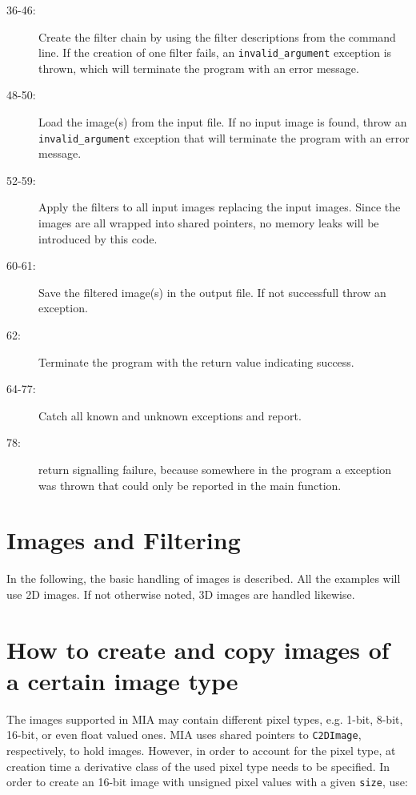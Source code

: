 \begin{description}
\item [36-46:] Create the filter chain by using the filter descriptions from the command line. 
       If the creation of one filter fails, an \texttt{invalid\_argument} exception is thrown, which will terminate the 
       program with an error message. 
\item [48-50:] Load the image(s) from the input file. 
       If no input image is found, throw an \texttt{invalid\_argument} exception that will terminate the program with an error message. 
\item [52-59:] Apply the filters to all input images replacing the input images. 
       Since the images are all wrapped into shared pointers, no memory leaks will be introduced by this code. 
\item [60-61:] Save the filtered image(s) in the output file. If not successfull throw an exception.
\item [62:] Terminate the program with the return value indicating success.
\item [64-77:] Catch all known and unknown exceptions and report.
\item [78:] return signalling failure, because somewhere in the program a exception was thrown that could only be reported 
    in the main function. 
\end{description}

\section{Images and Filtering}

\label{ch:images}

In the following, the basic handling of images is described. 
All the examples will use 2D images. 
If not otherwise noted, 3D images are handled likewise. 

\section{How to create and copy images of a certain image type}

The images supported in MIA  may contain different pixel types, e.g. 1-bit, 8-bit, 16-bit, or even float valued ones. 
MIA uses shared pointers to \texttt{C2DImage}, respectively,  to hold images. 
However, in order to account for the pixel type, at creation time a derivative class of the used pixel type needs to be specified. 
In order to create an 16-bit image with unsigned pixel values with a given \texttt{size}, use:


